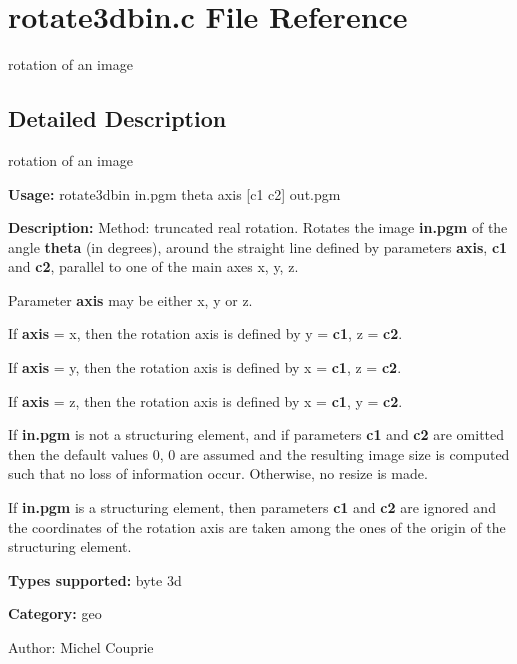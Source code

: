 \section{rotate3dbin.c File Reference}
\label{rotate3dbin_8c}
rotation of an image 



\subsection{Detailed Description}
rotation of an image 

{\bf Usage:} rotate3dbin in.pgm theta axis [c1 c2] out.pgm

{\bf Description:} Method: truncated real rotation. Rotates the image {\bf in.pgm} of the angle {\bf theta} (in degrees), around the straight line defined by parameters {\bf axis}, {\bf c1} and {\bf c2}, parallel to one of the main axes x, y, z.\par
 Parameter {\bf axis} may be either x, y or z.\par
 If {\bf axis} = x, then the rotation axis is defined by y = {\bf c1}, z = {\bf c2}.\par
 If {\bf axis} = y, then the rotation axis is defined by x = {\bf c1}, z = {\bf c2}.\par
 If {\bf axis} = z, then the rotation axis is defined by x = {\bf c1}, y = {\bf c2}.\par


If {\bf in.pgm} is not a structuring element, and if parameters {\bf c1} and {\bf c2} are omitted then the default values 0, 0 are assumed and the resulting image size is computed such that no loss of information occur. Otherwise, no resize is made.

If {\bf in.pgm} is a structuring element, then parameters {\bf c1} and {\bf c2} are ignored and the coordinates of the rotation axis are taken among the ones of the origin of the structuring element.

{\bf Types supported:} byte 3d

{\bf Category:} geo

\begin{Desc}
\item[Author:]Michel Couprie \end{Desc}
